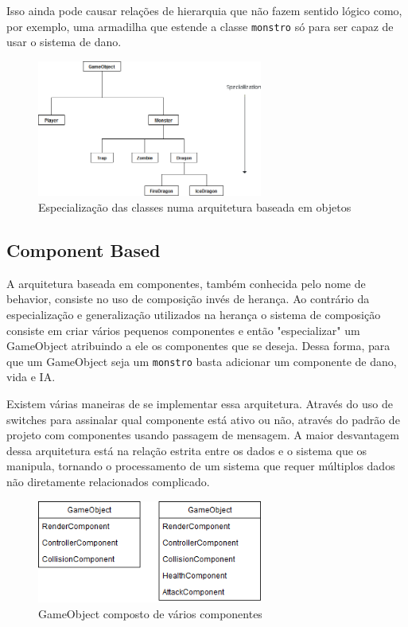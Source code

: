 \documentclass[12pt, 
openright, 
oneside, 
a4paper,    
brazil]{facom-ufu-abntex2}
\begin{document}
Isso ainda pode causar relações de hierarquia que não fazem sentido lógico como, por exemplo, uma armadilha que estende a classe \texttt{monstro} só para ser capaz de usar o sistema de dano.


\begin{figure}[H]
	\centering
	\includegraphics[width=20em]{imagens/gameobject_specialization.png}
	\caption{Especialização das classes numa arquitetura baseada em objetos}
\end{figure}

\subsection{Component Based}
A arquitetura baseada em componentes, também conhecida pelo nome de behavior, consiste no uso de composição invés de herança. Ao contrário da especialização e generalização utilizados na herança o sistema de composição consiste em criar vários pequenos componentes e então "especializar" um GameObject atribuindo a ele os componentes que se deseja. Dessa forma, para que um GameObject seja um \texttt{monstro} basta adicionar um componente de dano, vida e IA.

Existem várias maneiras de se implementar essa arquitetura. Através do uso de switches para assinalar qual componente está ativo ou não, através do padrão de projeto com componentes usando passagem de mensagem. A maior desvantagem dessa arquitetura está na relação estrita entre os dados e o sistema que os manipula, tornando o processamento de um sistema que requer múltiplos dados não diretamente relacionados complicado.


\begin{figure}[H]
	\centering
	\includegraphics[width=20em]{imagens/componentBased.png}
	\caption{GameObject composto de vários componentes}
\end{figure}
\end{document}
